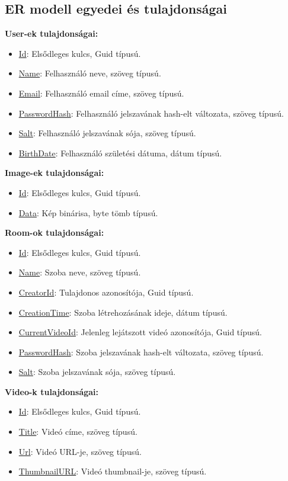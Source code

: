 \subsection*{ER modell egyedei és tulajdonságai}
\textbf{User-ek tulajdonságai:}
\begin{itemize}
    \item \underline{Id}: Elsődleges kulcs, Guid típusú.
    \item \underline{Name}: Felhasználó neve, szöveg típusú.
    \item \underline{Email}: Felhasználó email címe, szöveg típusú.
    \item \underline{PasswordHash}: Felhasználó jelszavának hash-elt változata, szöveg típusú.
    \item \underline{Salt}: Felhasználó jelszavának sója, szöveg típusú.
    \item \underline{BirthDate}: Felhasználó születési dátuma, dátum típusú.
\end{itemize}
\textbf{Image-ek tulajdonságai:}
\begin{itemize}
    \item \underline{Id}: Elsődleges kulcs, Guid típusú.
    \item \underline{Data}: Kép binárisa, byte tömb típusú.
\end{itemize}
\textbf{Room-ok tulajdonságai:}
\begin{itemize}
    \item \underline{Id}: Elsődleges kulcs, Guid típusú.
    \item \underline{Name}: Szoba neve, szöveg típusú.
    \item \underline{CreatorId}: Tulajdonos azonosítója, Guid típusú.
    \item \underline{CreationTime}: Szoba létrehozásának ideje, dátum típusú.
    \item \underline{CurrentVideoId}: Jelenleg lejátszott videó azonosítója, Guid típusú.
    \item \underline{PasswordHash}: Szoba jelszavának hash-elt változata, szöveg típusú.
    \item \underline{Salt}: Szoba jelszavának sója, szöveg típusú.
\end{itemize}
\textbf{Video-k tulajdonságai:}
\begin{itemize}
    \item \underline{Id}: Elsődleges kulcs, Guid típusú.
    \item \underline{Title}: Videó címe, szöveg típusú.
    \item \underline{Url}: Videó URL-je, szöveg típusú.
    \item \underline{ThumbnailURL}: Videó thumbnail-je, szöveg típusú.
\end{itemize}


